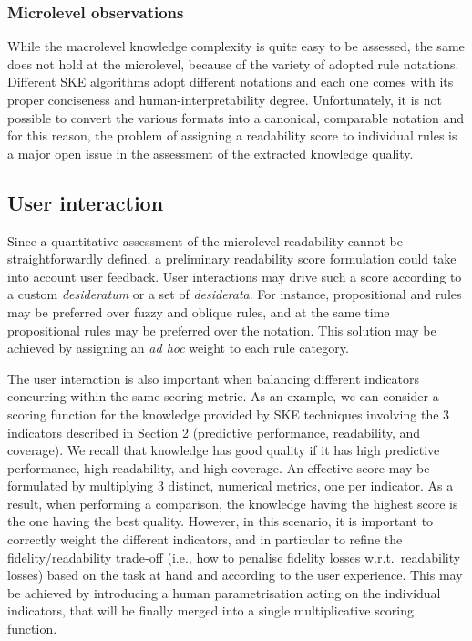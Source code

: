 \documentclass[sigconf]{acmart}
\begin{document}
\subsubsection{Microlevel observations}

While the macrolevel knowledge complexity is quite easy to be assessed, the same does not hold at the microlevel, because of the variety of adopted rule notations.
%
Different SKE algorithms adopt different notations and each one comes with its proper conciseness and human-interpretability degree.
%
Unfortunately, it is not possible to convert the various formats into a canonical, comparable notation and for this reason, the problem of assigning a readability score to individual rules is a major open issue in the assessment of the extracted knowledge quality.

\subsection{User interaction}

Since a quantitative assessment of the microlevel readability cannot be straightforwardly defined, a preliminary readability score formulation could take into account user feedback.
%
User interactions may drive such a score according to a custom \emph{desideratum} or a set of \emph{desiderata}.
%
For instance, propositional and \mofn{} rules may be preferred over fuzzy and oblique rules, and at the same time propositional rules may be preferred over the \mofn{} notation.
%
This solution may be achieved by assigning an \emph{ad hoc} weight to each rule category.

The user interaction is also important when balancing different indicators concurring within the same scoring metric.
%
As an example, we can consider a scoring function for the knowledge provided by SKE techniques involving the 3 indicators described in Section 2 (predictive performance, readability, and coverage).
%
We recall that knowledge has good quality if it has high predictive performance, high readability, and high coverage.
%
An effective score may be formulated by multiplying 3 distinct, numerical metrics, one per indicator.
%
As a result, when performing a comparison, the knowledge having the highest score is the one having the best quality.
%
However, in this scenario, it is important to correctly weight the different indicators, and in particular to refine the fidelity/readability trade-off (i.e., how to penalise fidelity losses w.r.t.\ readability losses) based on the task at hand and according to the user experience.
%
This may be achieved by introducing a human parametrisation acting on the individual indicators, that will be finally merged into a single multiplicative scoring function.
\end{document}
